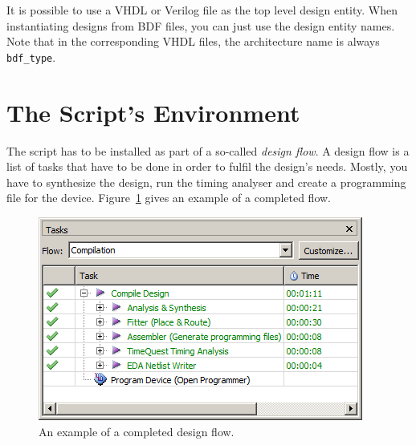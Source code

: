 \documentclass[11pt,a4paper,final,oneside,titlepage,fleqn]{article}
\begin{document}
It is possible to use a VHDL or Verilog file as the top level design entity.
When instantiating designs from BDF files, you can just use the design entity
names. Note that in the corresponding VHDL files, the architecture name is
always \texttt{bdf\_type}.



\section{The Script's Environment}
\label{sec:environment}
The script has to be installed as part of a so-called \textit{design flow}.
A design flow is a list of tasks that have to be done in order to
fulfil the design's needs. Mostly, you have to synthesize the design,
run the timing analyser and create a programming file for the device.
Figure~\ref{012exampleflow} gives an example of a completed flow.

\begin{figure}[h!]
  \centering
  \includegraphics[scale=0.44]{012exampleflow.png}
  \caption{An example of a completed design flow.}
  \label{012exampleflow}
\end{figure}
\end{document}
